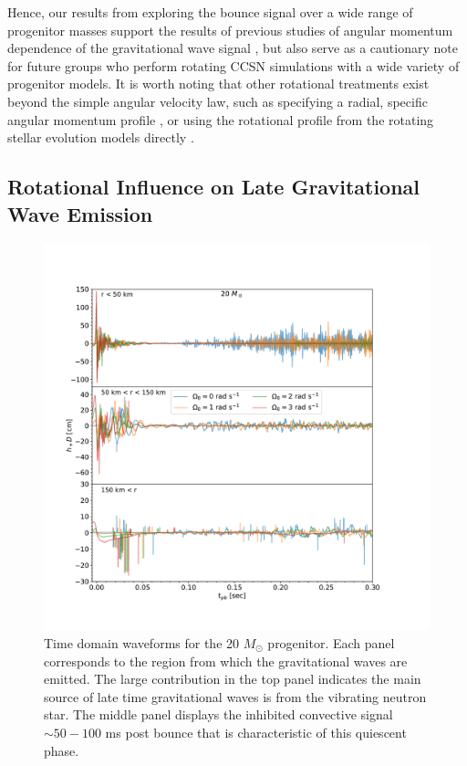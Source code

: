 \documentclass[twocolumn,times]{aastex62}  %
\begin{document}
Hence, our results from exploring the bounce signal over a wide range of progenitor masses support the results of previous studies of angular momentum dependence of the gravitational wave signal \citet{dimm:2008,abdik:2010,abdik:2014}, but also serve as a cautionary note for future groups who perform rotating CCSN simulations with a wide variety of progenitor models.  
It is worth noting that other rotational treatments exist beyond the simple angular velocity law, such as specifying a radial, specific angular momentum profile \citep[eg.][]{oconnor:2011}, or using the rotational profile from the rotating stellar evolution models directly \citep{summa:2018}.






\subsection{Rotational Influence on Late Gravitational Wave Emission}


\begin{figure}[htp]
  \centering     %
  \includegraphics[width=\textwidth]{figures/tdwf_region_20.pdf}
  \caption{Time domain waveforms for the 20 $M_\odot$ progenitor.  Each panel corresponds to the region from which the gravitational waves are emitted.  The large contribution in the top panel indicates the main source of late time gravitational waves is from the vibrating neutron star.  The middle panel displays the inhibited convective signal $\sim 50-100 $ ms post bounce that is characteristic of this quiescent phase.}
  \label{fig:region}
\end{figure}
\end{document}
